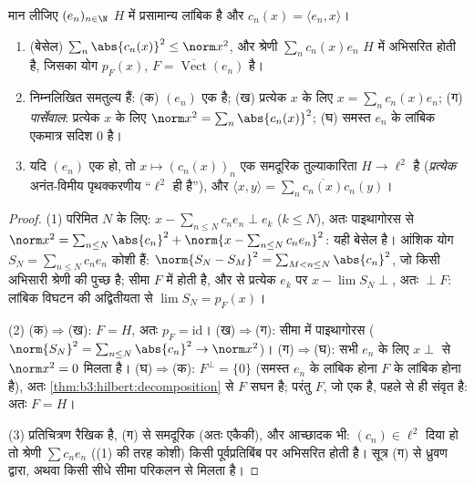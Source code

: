 \begin{theorem}[बेसेल, पार्सेवाल]\label{thm:b3:hilbert:parseval}
मान लीजिए $(e_n)_{n\in\N}$ $H$ में प्रसामान्य लांबिक है और $c_n(x) =
\langle e_n, x\rangle$।
\begin{enumerate}
  \item (बेसेल) $\sum_n\abs{c_n(x)}^2 \leq \norm x^2$, और श्रेणी $\sum_nc_n(x)e_n$ $H$ में अभिसरित होती है,
        जिसका योग $p_F(x)$, $F = \overline{\operatorname{Vect}}(e_n)$ है।
  \item निम्नलिखित समतुल्य हैं: (क) $(e_n)$ एक  है;
        (ख) प्रत्येक $x$ के लिए $x = \sum_nc_n(x)e_n$; (ग)
        \emph{पार्सेवाल}: प्रत्येक
        $x$ के लिए $\norm x^2
        = \sum_n\abs{c_n(x)}^2$; (घ) समस्त $e_n$ के लांबिक एकमात्र
        सदिश $0$ है।
  \item यदि $(e_n)$ एक  हो, तो $x \mapsto (c_n(x))_n$ एक समदूरिक
        तुल्याकारिता $H \to \ell^2$ है (\emph{प्रत्येक} अनंत-विमीय
        पृथक्करणीय  ``$\ell^2$ ही है''), और $\langle x, y\rangle =
        \sum_n\overline{c_n(x)}c_n(y)$।
\end{enumerate}
\end{theorem}

\begin{proof}
(1) परिमित $N$ के लिए: $x - \sum_{n\leq N}c_ne_n \perp e_k$ ($k
\leq N$), अतः पाइथागोरस से $\norm x^2 = \sum_{n\leq
N}\abs{c_n}^2 + \norm{x - \sum_{n\leq N}c_ne_n}^2$:
यही बेसेल है। आंशिक योग $S_N = \sum_{n\leq N}c_ne_n$ कोशी हैं: $\norm{S_N - S_M}^2 = \sum_{M<n\leq N}\abs{c_n}^2$, जो किसी अभिसारी
श्रेणी की पुच्छ है; सीमा $F$ में होती है, और  से प्रत्येक
$e_k$ पर $x - \lim S_N
\perp$, अतः $\perp F$: लांबिक विघटन की अद्वितीयता से $\lim S_N = p_F(x)$।

(2) (क)$\Rightarrow$(ख): $F = H$, अतः $p_F = \mathrm{id}$।
(ख)$\Rightarrow$(ग): सीमा में पाइथागोरस ($\norm{S_N}^2
= \sum_{n \leq N}\abs{c_n}^2 \to \norm x^2$)।
(ग)$\Rightarrow$(घ): सभी $e_n$ के लिए $x \perp$ से $\norm x^2 =
0$ मिलता है।
(घ)$\Rightarrow$(क): $F^\perp = \{0\}$ (समस्त $e_n$ के लांबिक होना $F$ के लांबिक
होना है), अतः \cref{thm:b3:hilbert:decomposition} से $F$ सघन है; परंतु $F$, जो एक 
है, पहले से ही संवृत है: अतः $F = H$।

(3) प्रतिचित्रण रैखिक है, (ग) से समदूरिक (अतः एकैकी), और आच्छादक
भी: $(c_n) \in \ell^2$ दिया हो तो श्रेणी $\sum
c_ne_n$ ((1) की तरह कोशी) किसी
पूर्वप्रतिबिंब पर अभिसरित होती है।  सूत्र (ग) से ध्रुवण
द्वारा, अथवा किसी सीधे सीमा परिकलन से मिलता है।
\end{proof}

